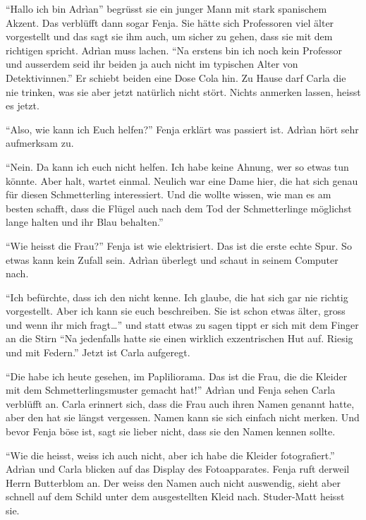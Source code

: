 \enquote{Hallo ich bin Adrìan} begrüsst sie ein junger Mann mit stark spanischem Akzent. Das verblüfft dann sogar Fenja. Sie hätte sich Professoren viel älter vorgestellt und das sagt sie ihm auch, um sicher zu gehen, dass sie mit dem richtigen spricht. Adrìan muss lachen. \enquote{Na erstens bin ich noch kein Professor und ausserdem seid ihr beiden ja auch nicht im typischen Alter von Detektivinnen.} Er schiebt beiden eine Dose Cola hin. Zu Hause darf Carla die nie trinken, was sie aber jetzt natürlich nicht stört. Nichts anmerken lassen, heisst es jetzt.

\enquote{Also, wie kann ich Euch helfen?} Fenja erklärt was passiert ist. Adrìan hört sehr aufmerksam zu.

\enquote{Nein. Da kann ich euch nicht helfen. Ich habe keine Ahnung, wer so etwas tun könnte. Aber halt, wartet einmal. Neulich war eine Dame hier, die hat sich genau für diesen Schmetterling interessiert. Und die wollte wissen, wie man es am besten schafft, dass die Flügel auch nach dem Tod der Schmetterlinge möglichst lange halten und ihr Blau behalten.}

\enquote{Wie heisst die Frau?} Fenja ist wie elektrisiert. Das ist die erste echte Spur. So etwas kann kein Zufall sein. Adrìan überlegt und schaut in seinem Computer nach.

\enquote{Ich befürchte, dass ich den nicht kenne. Ich glaube, die hat sich gar nie richtig vorgestellt. Aber ich kann sie euch beschreiben. Sie ist schon etwas älter, gross und wenn ihr mich fragt\dots} und statt etwas zu sagen tippt er sich mit dem Finger an die Stirn \enquote{Na jedenfalls hatte sie einen wirklich exzentrischen Hut auf. Riesig und mit Federn.} Jetzt ist Carla aufgeregt. 

\enquote{Die habe ich heute gesehen, im Papliliorama. Das ist die Frau, die die Kleider mit dem Schmetterlingsmuster gemacht hat!} Adrìan und Fenja sehen Carla verblüfft an. Carla erinnert sich, dass die Frau auch ihren Namen genannt hatte, aber den hat sie längst vergessen. Namen kann sie sich einfach nicht merken. Und bevor Fenja böse ist, sagt sie lieber nicht, dass sie den Namen kennen sollte.

\enquote{Wie die heisst, weiss ich auch nicht, aber ich habe die Kleider fotografiert.} Adrìan und Carla blicken auf das Display des Fotoapparates. Fenja ruft derweil Herrn Butterblom an. Der weiss den Namen auch nicht auswendig, sieht aber schnell auf dem Schild unter dem ausgestellten Kleid nach. Studer-Matt heisst sie.

